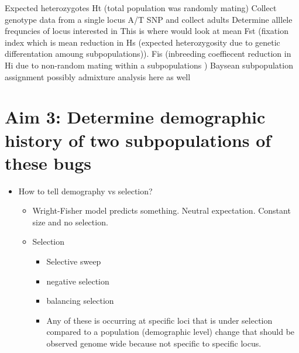\documentclass[11pt]{article}
\begin{document}
Expected heterozygotes Ht (total population was randomly mating)
Collect genotype data from a single locus A/T SNP and collect
adults 
Determine alllele frequncies of locus interested in
This is where would look at mean Fst (fixation index which is mean reduction in Hs (expected heterozygosity due to genetic differentation amoung subpopulations)).
Fis (inbreeding coeffiecent reduction in Hi due to non-random mating within a subpopulations )
Baysean subpopulation assignment 
possibly admixture analysis here as well


\section*{Aim 3: Determine demographic history of two subpopulations of these bugs}

\begin{itemize}
	\item How to tell demography vs selection?
	\begin{itemize}
		\item Wright-Fisher model predicts something. Neutral expectation. Constant size and no selection.
		\item Selection
		\begin{itemize}
			\item Selective sweep
			\item negative selection
			\item balancing selection 
			\item Any of these is occurring at specific loci that is under selection compared to a population (demographic level) change that should be observed genome wide because not specific to specific locus. 
		\end{itemize}
	\end{itemize}
\end{itemize}


\pagebreak


\end{document}
